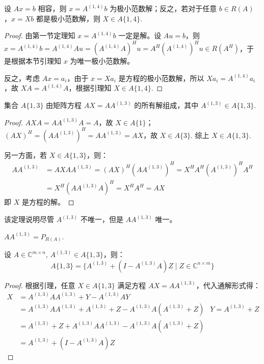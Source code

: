 \begin{theorem}[相容方程组的极小范数解与 1,4-逆]
设 $Ax=b$ 相容，则 $x=A^{(1,4)}b$ 为极小范数解；反之，若对于任意 $b\in R(A)$，$x=Xb$ 都是极小范数解，则 $X\in A\{1,4\}$.
\end{theorem}
\begin{proof}
由第一节定理知 $x=A^{(1,4)}b$ 一定是解。设 $Au=b$，则 $x=A^{(1,4)}b=A^{(1,4)}Au=(A^{(1,4)}A)^Hu=A^H(A^{(1,4)})^Hu\in R(A^H)$，于是根据本节引理知 $x$ 为唯一极小范数解。

反之，考虑 $Ax=a_i$，由于 $x=Xa_i$ 是方程的极小范数解，所以 $Xa_i=A^{(1,4)}a_i$，故 $XA=A^{(1,4)}A$，根据引理知 $X\in A\{1,4\}$.
\end{proof}

\begin{lemma}
集合 $A\{1,3\}$ 由矩阵方程 $AX=AA^{(1,3)}$ 的所有解组成，其中 $A^{(1,3)}\in A\{1,3\}$.
\end{lemma}
\begin{proof}
$AXA=AA^{(1,3)}A=A$，故 $X\in A\{1\}$；$(AX)^H=(AA^{(1,3)})^H=AA^{(1,3)}=AX$，故 $X\in A\{3\}$. 综上 $X\in A\{1,3\}$.

另一方面，若 $X\in A\{1,3\}$，则：
\begin{align*}
    AA^{(1,3)}&=AXAA^{(1,3)}=(AX)^H(AA^{(1,3)})^H=X^HA^H(A^{(1,3)})^HA^H\\
    &=X^H(AA^{(1,3)}A)^H=X^HA^H=AX
\end{align*}
即 $X$ 是方程的解。
\end{proof}

\begin{remark}
该定理说明尽管 $A^{(1,3)}$ 不唯一，但是 $AA^{(1,3)}$ 唯一。
\end{remark}

\begin{corollary}
$AA^{(1,3)}=P_{R(A)}$.
\end{corollary}

\begin{theorem}
设 $A\in\mathbb C^{m\times n},\,A^{(1,3)}\in A\{1,3\}$，则：
\[
    A\{1,3\}=\{A^{(1,3)}+(I-A^{(1,3)}A)Z\mid Z\in\mathbb C^{n\times m}\}
\]
\end{theorem}
\begin{proof}
根据引理，任意 $X\in A\{1,3\}$ 满足方程 $AX=AA^{(1,3)}$，代入通解形式得：
\begin{align*}
    X&=A^{(1,3)}AA^{(1,3)}+Y-A^{(1,3)}AY\\
    &=A^{(1,3)}AA^{(1,3)}+A^{(1,3)}+Z-A^{(1,3)}A(A^{(1,3)}+Z)&Y=A^{(1,3)}+Z\\
    &=A^{(1,3)}+Z+A^{(1,3)}AA^{(1,3)}-A^{(1,3)}A(A^{(1,3)}+Z)\\
    &=A^{(1,3)}+(I-A^{(1,3)}A)Z
\end{align*}
\end{proof}

